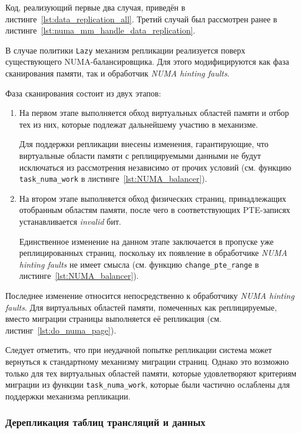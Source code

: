 Код, реализующий первые два случая, приведён в листинге~\ref{lst:data_replication_all}. Третий случай был рассмотрен ранее в листинге~\ref{lst:numa_mm_handle_data_replication}.

В случае политики \texttt{Lazy} механизм репликации реализуется поверх существующего NUMA-балансировщика. Для этого модифицируются как фаза сканирования памяти, так и обработчик \textit{NUMA hinting faults}.

Фаза сканирования состоит из двух этапов:
\begin{enumerate}
	\item На первом этапе выполняется обход виртуальных областей памяти и отбор тех из них, которые подлежат дальнейшему участию в механизме.

	Для поддержки репликации внесены изменения, гарантирующие, что виртуальные области памяти с реплицируемыми данными не будут исключаться из рассмотрения независимо от прочих условий (см. функцию \texttt{task\_numa\_work} в листинге~\ref{lst:NUMA_balancer}).

	\item На втором этапе выполняется обход физических страниц, принадлежащих отобранным областям памяти, после чего в соответствующих PTE-записях устанавливается \textit{invalid} бит.

	Единственное изменение на данном этапе заключается в пропуске уже реплицированных страниц, поскольку их появление в обработчике \textit{NUMA hinting faults} не имеет смысла (см. функцию \texttt{change\_pte\_range} в листинге~\ref{lst:NUMA_balancer}).
\end{enumerate}

Последнее изменение относится непосредственно к обработчику \textit{NUMA hinting faults}. Для виртуальных областей памяти, помеченных как реплицируемые, вместо миграции страницы выполняется её репликация (см. листинг~\ref{lst:do_numa_page}).

Следует отметить, что при неудачной попытке репликации система может вернуться к стандартному механизму миграции страниц. Однако это возможно только для тех виртуальных областей памяти, которые удовлетворяют критериям миграции из функции \texttt{task\_numa\_work}, которые были частично ослаблены для поддержки механизма репликации.

\subsubsection{Дерепликация таблиц трансляций и данных}

